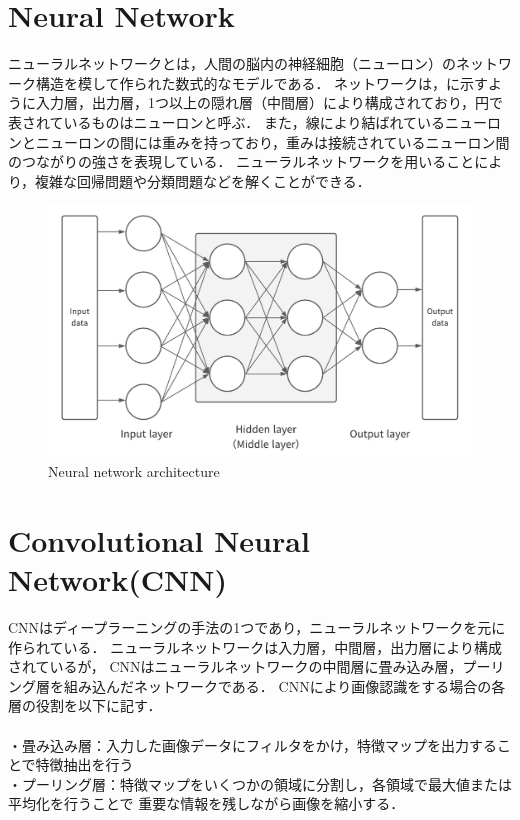 \documentclass[../main]{subfiles}
\begin{document}
        \section{Neural Network}
        ニューラルネットワークとは，人間の脳内の神経細胞（ニューロン）のネットワーク構造を模して作られた数式的なモデルである．
        ネットワークは，に示すように入力層，出力層，1つ以上の隠れ層（中間層）により構成されており，円で表されているものはニューロンと呼ぶ．
        また，線により結ばれているニューロンとニューロンの間には重みを持っており，重みは接続されているニューロン間のつながりの強さを表現している．
        ニューラルネットワークを用いることにより，複雑な回帰問題や分類問題などを解くことができる．
        \begin{figure}[H]
         \centering
         \includegraphics[width=12cm]{../images/NN.png}
         \caption{Neural network architecture}
         \label{figure::NN}
        \end{figure}

        \newpage
        
        \section{Convolutional Neural Network(CNN)}
        CNNはディープラーニングの手法の1つであり，ニューラルネットワークを元に作られている．
        ニューラルネットワークは入力層，中間層，出力層により構成されているが，
        CNNはニューラルネットワークの中間層に畳み込み層，プーリング層を組み込んだネットワークである．
        CNNにより画像認識をする場合の各層の役割を以下に記す．\\\\
        ・畳み込み層：入力した画像データにフィルタをかけ，特徴マップを出力することで特徴抽出を行う\\
        ・プーリング層：特徴マップをいくつかの領域に分割し，各領域で最大値または平均化を行うことで
        重要な情報を残しながら画像を縮小する．\\
\end{document}
